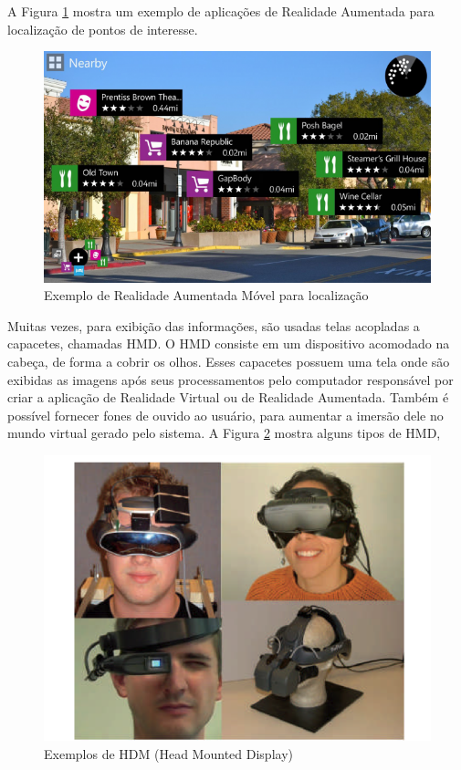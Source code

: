 A Figura \ref{fig:AR-map-locations12} mostra um exemplo de aplicações de Realidade
Aumentada para localização de pontos de interesse.

\begin{figure}[h!]
    \centering
    \caption{Exemplo de Realidade Aumentada Móvel para localização}
    \label{fig:AR-map-locations12}
    \includegraphics[width=15cm]{resources/nokia_city_lens-625x373-c.png}
\end{figure}




\label{def:hmd}
Muitas vezes, para exibição das informações, são usadas telas acopladas a capacetes,
chamadas \gls{HMD}. O \gls{HMD} consiste em um dispositivo acomodado na cabeça, de forma a cobrir os olhos.
Esses capacetes possuem uma tela onde são exibidas as imagens após seus processamentos pelo computador
responsável por criar a aplicação de Realidade Virtual ou de Realidade Aumentada. Também é possível
fornecer fones de ouvido ao usuário, para aumentar a imersão dele no mundo virtual gerado pelo sistema.
A Figura \ref{fig:hmd_example} mostra alguns tipos de \gls{HMD},

\begin{figure}[h!]
    \centering
    \caption{Exemplos de HDM (Head Mounted Display)}
    \label{fig:hmd_example}
    \includegraphics[width=13cm]{resources/HMD.png}
\end{figure}


